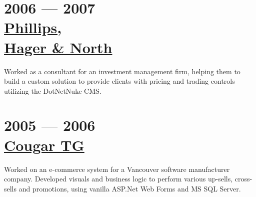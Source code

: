 \documentclass[margin]{res}
\begin{document}
\begin{resume}
	\section{2006 --- 2007\\\href{https://wwwphn.com/}{Phillips,\\Hager \& North}}
	Worked as a consultant for an investment management firm, helping them to build a custom solution to provide clients with pricing and trading controls utilizing the DotNetNuke CMS.\\

	\section{2005 --- 2006\\\href{http://cougartg.com}{Cougar TG}}
	Worked on an e-commerce system for a Vancouver software manufacturer company. Developed visuals and business logic to perform various up-sells, cross-sells and promotions, using vanilla ASP.Net Web Forms and MS SQL Server.


\end{resume}
\end{document}
